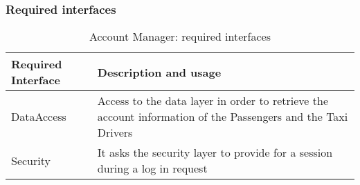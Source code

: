 \subsubsection{Required interfaces}
\begin{table}[H]
\begin{longtable}{| l | p{} |}
\hline
 \textbf{Required Interface} & \textbf{Description and usage} \\ \hline
DataAccess & Access to the data layer in order to retrieve the account information of the Passengers and the Taxi Drivers \\
Security & It asks the security layer to provide for a session during a log in request \\ \hline
\end{longtable}
\caption{Account Manager: required interfaces}
\label{tab:accountManager:requiredInterfaces}
\end{table}
